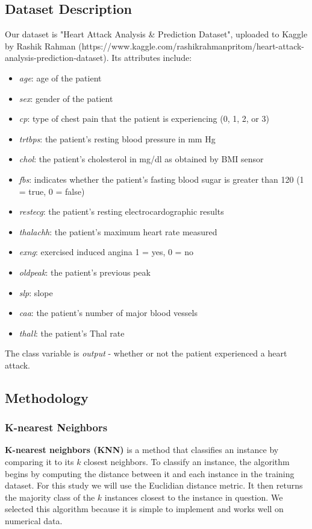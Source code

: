 \documentclass{article}
\begin{document}
\subsection{Dataset Description}
Our dataset is "Heart Attack Analysis \& Prediction Dataset", uploaded to Kaggle by Rashik Rahman (https://www.kaggle.com/rashikrahmanpritom/heart-attack-analysis-prediction-dataset). Its attributes include:
\begin{itemize}
\item \textit{age}: age of the patient
\item \textit{sex}: gender of the patient
\item \textit{cp}: type of chest pain that the patient is experiencing (0, 1, 2, or 3)
\item \textit{trtbps}: the patient's resting blood pressure in mm Hg
\item \textit{chol}: the patient's cholesterol in mg/dl as obtained by BMI sensor
\item \textit{fbs}: indicates whether the patient's fasting blood sugar is greater than 120 (1 = true, 0 = false)
\item \textit{restecg}: the patient's resting electrocardographic results
\item \textit{thalachh}: the patient's maximum heart rate measured
\item \textit{exng}: exercised induced angina {1 = yes, 0 = no}
\item \textit{oldpeak}: the patient's previous peak
\item \textit{slp}: slope
\item \textit{caa}: the patient's number of major blood vessels
\item \textit{thall}: the patient's Thal rate
\end{itemize}
The class variable is \textit{output} - whether or not the patient experienced a heart attack.
\subsection{Methodology}
\subsubsection{K-nearest Neighbors}
\textbf{K-nearest neighbors (KNN)} is a method that classifies an instance by comparing it to its $k$ closest neighbors. To classify an instance, the algorithm begins by computing the distance between it and each instance in the training dataset. For this study we will use the Euclidian distance metric. It then returns the majority class of the $k$ instances closest to the instance in question. We selected this algorithm because it is simple to implement and works well on numerical data.
\end{document}
